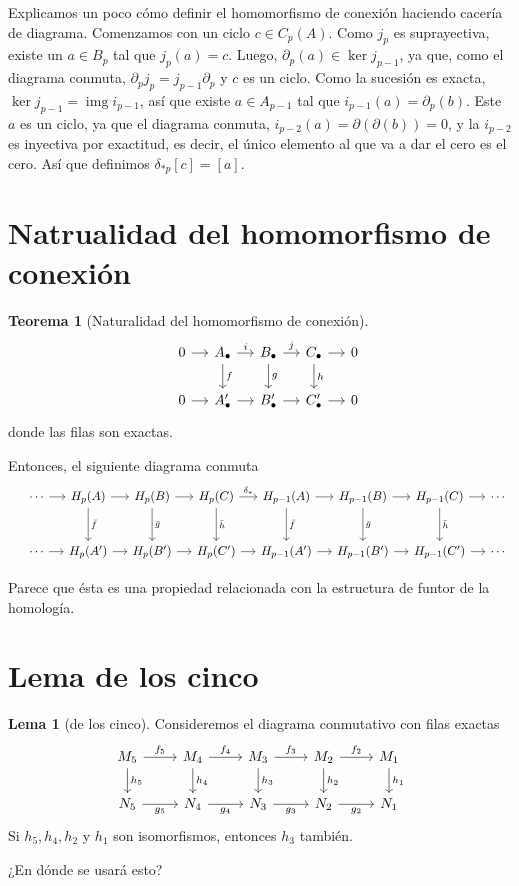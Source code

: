 \documentclass[spanish]{book}
\theoremstyle{definition}
\newtheorem*{lema}{Lema}
\newtheorem*{teo}{Teorema}
\DeclareMathOperator{\img}{img}
\begin{document}
	Explicamos un poco cómo definir el homomorfismo de conexión haciendo cacería de diagrama. Comenzamos con un ciclo $c\in C_p(A)$. Como $j_p$ es suprayectiva, existe un $a\in B_p$ tal que $j_p(a)=c$. Luego, $\partial_p(a)\in\ker j_{p-1}$, ya que, como el diagrama conmuta, $\partial_pj_p=j_{p-1}\partial_p$ y $c$ es un ciclo. Como la sucesión es exacta, $\ker j_{p-1}=\img i_{p-1}$, así que existe $a\in A_{p-1}$ tal que $i_{p-1}(a)=\partial_p(b)$. Este $a$ es un ciclo, ya que el diagrama conmuta, $i_{p-2}(a)=\partial(\partial(b))=0$, y la $i_{p-2}$ es inyectiva por exactitud, es decir, el único elemento al que va a dar el cero es el cero. Así que definimos $\delta_{*p}[c]=[a]$.
\section{Natrualidad del homomorfismo de conexión}
	\begin{teo}[Naturalidad del homomorfismo de conexión]
		\[\begin{tikzcd}[column sep=small]
			&0\arrow{r}&A_\bullet\arrow{r}{i}\arrow{d}{f}&B_\bullet\arrow{r}{j}\arrow{d}{g}&C_\bullet\arrow{r}\arrow{d}{h}&0\\
			&0\arrow{r}&A'_\bullet\arrow{r}&B'_\bullet\arrow{r}&C'_\bullet\arrow{r}&0
		\end{tikzcd}\]
		donde las filas son exactas.\par
		Entonces, el siguiente diagrama conmuta
		\[\begin{tikzcd}[column sep=small, row sep=large]
			& \cdots \arrow{r} & H_p(A) \arrow{r} \arrow{d}{\bar{f}} & H_p(B) \arrow{r} \arrow{d}{\bar{g}} & H_p(C) \arrow{r}{\delta_*} \arrow{d}{\bar{h}} & H_{p-1}(A) \arrow{r} \arrow{d}{\bar{f}} & H_{p-1}(B) \arrow{r} \arrow{d}{\bar{g}} & H_{p-1}(C) \arrow{r} \arrow{d}{\bar{h}} & \cdots \\
			& \cdots \arrow{r} & H_p(A') \arrow{r} & H_p(B') \arrow{r} & H_p(C') \arrow{r} & H_{p-1}(A') \arrow{r} & H_{p-1}(B') \arrow{r} & H_{p-1}(C') \arrow{r} & \cdots
		\end{tikzcd}\]
	\end{teo}
	Parece que ésta es una propiedad relacionada con la estructura de funtor de la homología.
\section{Lema de los cinco}
	\begin{lema}[de los cinco]
		Consideremos el diagrama conmutativo con filas exactas
		\[\begin{tikzcd}
			M_5\arrow{r}{f_5}\arrow{d}{h_5}&M_4\arrow{r}{f_4}\arrow{d}{h_4}&M_3\arrow{r}{f_3}\arrow{d}{h_3}&M_2\arrow{r}{f_2}\arrow{d}{h_2}&M_1\arrow{d}{h_1}\\
			N_5\arrow[r,swap,"g_5"]&N_4\arrow[r,swap,"g_4"]&N_3\arrow[r,swap,"g_3"]&N_2\arrow[r,swap,"g_2"]&N_1
		\end{tikzcd}\]
		Si $h_5,h_4,h_2$ y $h_1$ son isomorfismos, entonces $h_3$ también.
	\end{lema}
	¿En dónde se usará esto?
\end{document}
